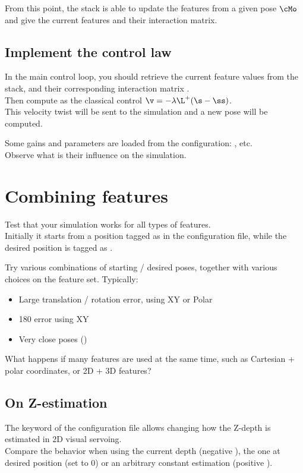 \documentclass{ecnreport}
\begin{document}
From this point, the stack is able to update the features from a given pose $\cMo$ and give the current features and their interaction matrix.

\subsection{Implement the control law}

In the main control loop, you should retrieve the current feature values  from the stack, and their corresponding interaction matrix .\\
Then compute  as the classical control $\v = -\lambda\L^+(\s-\ss)$.\\

This velocity twist will be sent to the simulation and a new pose will be computed.

Some gains and parameters are loaded from the configuration: , etc.\\
Observe what is their influence on the simulation.

\section{Combining features}

Test that your simulation works for all types of features. \\

Initially it starts from a position tagged as  in the configuration file, while the desired position is tagged as .

Try various combinations of starting / desired poses, together with various choices on the feature set. Typically:
\begin{itemize}
 \item Large translation / rotation error, using XY or Polar
 \item 180 error using XY
 \item Very close poses ()
\end{itemize}


What happens if many features are used at the same time, such as Cartesian + polar coordinates, or 2D + 3D features?

\subsection{On Z-estimation}

The  keyword of the configuration file allows changing how the Z-depth is estimated in 2D visual servoing.\\
Compare the behavior when using the current depth (negative ), the one at desired position (set  to 0) or an arbitrary constant estimation (positive ).
\end{document}
